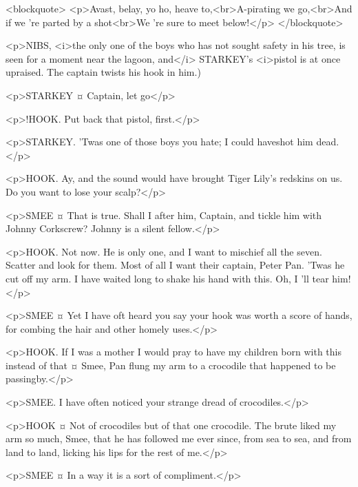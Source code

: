 <blockquote> <p>Avast, belay, yo ho, heave to,<br>A-pirating we go,<br>And if we 're parted by a shot<br>We 're sure to meet below!</p> </blockquote>

\begin{stagedir}
<p>NIBS, <i>the only one of the boys who has not sought safety in his tree, is seen for a moment near the lagoon, and</i> STARKEY's <i>pistol is at once upraised. The captain twists his hook in him.)
\end{stagedir}

<p>STARKEY ¤
Captain, let go</p>

<p>!HOOK. Put back that pistol, first.</p>

<p>STARKEY. 'Twas one of those boys you hate; I could haveshot him dead.</p>

<p>HOOK. Ay, and the sound would have brought Tiger Lily's redskins on us. Do you want to lose your scalp?</p>

<p>SMEE ¤
That is true. Shall I after him, Captain, and tickle him with Johnny Corkscrew? Johnny is a silent fellow.</p>

<p>HOOK. Not now. He is only one, and I want to mischief all the seven. Scatter and look for them.
Most of all I want their captain, Peter Pan. 'Twas he cut off my arm. I have waited long to shake his hand with this.
Oh, I 'll tear him!</p>

<p>SMEE ¤
Yet I have oft heard you say your hook was worth a score of hands, for combing the hair and other homely uses.</p>

<p>HOOK. If I was a mother I would pray to have my children born with this instead of that ¤
Smee, Pan flung my arm to a crocodile that happened to be passingby.</p>

<p>SMEE. I have often noticed your strange dread of crocodiles.</p>

<p>HOOK ¤
Not of crocodiles but of that one crocodile.
The brute liked my arm so much, Smee, that he has followed me ever since, from sea to sea, and from land to land, licking his lips for the rest of me.</p>

<p>SMEE ¤
In a way it is a sort of compliment.</p>

